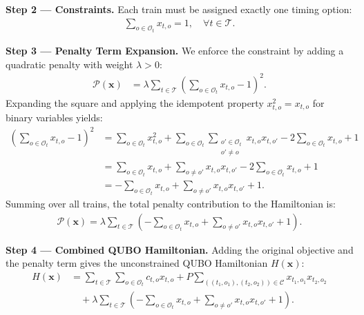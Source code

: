 \documentclass[12pt]{article}
\begin{document}
\textbf{Step 2 --- Constraints.}
Each train must be assigned exactly one timing option:
\begin{align}
\sum_{o \in \mathcal{O}_t} x_{t,o} = 1, \quad \forall t \in \mathcal{T}.
\end{align}

\textbf{Step 3 --- Penalty Term Expansion.}
We enforce the constraint by adding a quadratic penalty with weight $\lambda > 0$:
\begin{align}
\mathcal{P}(\mathbf{x}) &= \lambda \sum_{t \in \mathcal{T}} \left( \sum_{o \in \mathcal{O}_t} x_{t,o} - 1 \right)^2.
\end{align}
Expanding the square and applying the idempotent property $x_{t,o}^2 = x_{t,o}$ for binary variables yields:
\begin{align}
\left( \sum_{o \in \mathcal{O}_t} x_{t,o} - 1 \right)^2 &= \sum_{o \in \mathcal{O}_t} x_{t,o}^2 + \sum_{o \in \mathcal{O}_t} \sum_{\substack{o' \in \mathcal{O}_t \\ o' \neq o}} x_{t,o} x_{t,o'} - 2 \sum_{o \in \mathcal{O}_t} x_{t,o} + 1 \nonumber \\
&= \sum_{o \in \mathcal{O}_t} x_{t,o} + \sum_{o \neq o'} x_{t,o} x_{t,o'} - 2 \sum_{o \in \mathcal{O}_t} x_{t,o} + 1 \nonumber \\
&= -\sum_{o \in \mathcal{O}_t} x_{t,o} + \sum_{o \neq o'} x_{t,o} x_{t,o'} + 1.
\end{align}
Summing over all trains, the total penalty contribution to the Hamiltonian is:
\begin{align}
\mathcal{P}(\mathbf{x}) = \lambda \sum_{t \in \mathcal{T}} \left( -\sum_{o \in \mathcal{O}_t} x_{t,o} + \sum_{o \neq o'} x_{t,o} x_{t,o'} + 1 \right).
\end{align}

\textbf{Step 4 --- Combined QUBO Hamiltonian.}
Adding the original objective and the penalty term gives the unconstrained QUBO Hamiltonian $H(\mathbf{x})$:
\begin{align}
H(\mathbf{x}) &= \sum_{t \in \mathcal{T}} \sum_{o \in \mathcal{O}_t} c_{t,o} x_{t,o} + P \sum_{((t_1,o_1),(t_2,o_2)) \in \mathcal{C}} x_{t_1,o_1} x_{t_2,o_2} \nonumber \\
&\quad + \lambda \sum_{t \in \mathcal{T}} \left( -\sum_{o \in \mathcal{O}_t} x_{t,o} + \sum_{o \neq o'} x_{t,o} x_{t,o'} + 1 \right).
\end{align}
\end{document}
